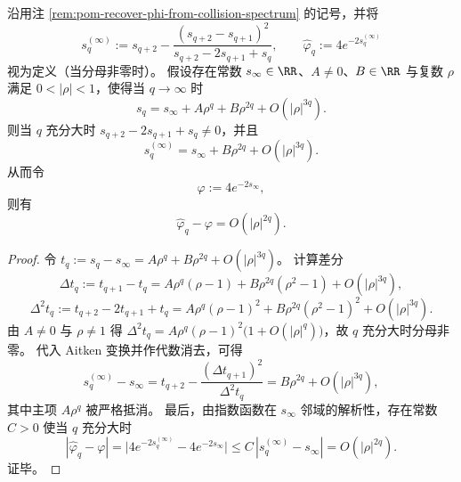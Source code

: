 \begin{theorem}\label{thm:pom-aitken-delta2-square-convergence}
沿用注 \ref{rem:pom-recover-phi-from-collision-spectrum} 的记号，并将
\[
s_q^{(\infty)}
:=
s_{q+2}-\frac{(s_{q+2}-s_{q+1})^2}{s_{q+2}-2s_{q+1}+s_q},
\qquad
\widehat\varphi_q:=4e^{-2s_q^{(\infty)}}
\]
视为定义（当分母非零时）。
假设存在常数 \(s_\infty\in\RR\)、\(A\neq 0\)、\(B\in\RR\) 与复数 \(\rho\) 满足 \(0<|\rho|<1\)，使得当 \(q\to\infty\) 时
\[
s_q
=
s_\infty+A\rho^q+B\rho^{2q}+O(|\rho|^{3q}).
\]
则当 \(q\) 充分大时 \(s_{q+2}-2s_{q+1}+s_q\neq 0\)，并且
\[
s_q^{(\infty)}
=
s_\infty+B\rho^{2q}+O(|\rho|^{3q}).
\]
从而令
\[
\varphi:=4e^{-2s_\infty},
\]
则有
\[
\widehat\varphi_q-\varphi=O(|\rho|^{2q}).
\]
\end{theorem}
\begin{proof}
令
\(
t_q:=s_q-s_\infty
=A\rho^q+B\rho^{2q}+O(|\rho|^{3q})
\)。
计算差分
\[
\Delta t_q:=t_{q+1}-t_q
=A\rho^q(\rho-1)+B\rho^{2q}(\rho^2-1)+O(|\rho|^{3q}),
\]
\[
\Delta^2 t_q:=t_{q+2}-2t_{q+1}+t_q
=A\rho^q(\rho-1)^2+B\rho^{2q}(\rho^2-1)^2+O(|\rho|^{3q}).
\]
由 \(A\neq 0\) 与 \(\rho\neq 1\) 得 \(\Delta^2 t_q=A\rho^q(\rho-1)^2\bigl(1+O(|\rho|^{q})\bigr)\)，故 \(q\) 充分大时分母非零。
代入 Aitken 变换并作代数消去，可得
\[
s_q^{(\infty)}-s_\infty
=t_{q+2}-\frac{(\Delta t_{q+1})^2}{\Delta^2 t_q}
=B\rho^{2q}+O(|\rho|^{3q}),
\]
其中主项 \(A\rho^q\) 被严格抵消。
最后，由指数函数在 \(s_\infty\) 邻域的解析性，存在常数 \(C>0\) 使当 \(q\) 充分大时
\[
|\widehat\varphi_q-\varphi|
=\bigl|4e^{-2s_q^{(\infty)}}-4e^{-2s_\infty}\bigr|
\le
C\,|s_q^{(\infty)}-s_\infty|
=O(|\rho|^{2q}).
\]
证毕。
\end{proof}

\endinput
